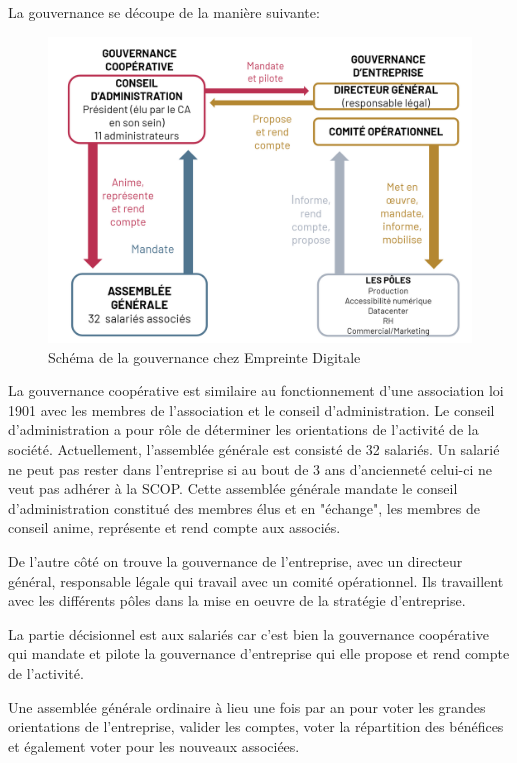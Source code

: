 \documentclass[12pt]{article}
\begin{document}
\newpage
La gouvernance se découpe de la manière suivante:
\begin{figure}[!ht]
    \centering
    \includegraphics[width=\textwidth]{src/scheme_scop_ed.png}
    \caption{Schéma de la gouvernance chez Empreinte Digitale}
    \label{fig:gouvernance_ed}
\end{figure}

La gouvernance coopérative est similaire au fonctionnement d'une association loi 1901 avec les membres de l'association et le conseil d'administration. 
Le conseil d'administration a pour rôle de déterminer les orientations de l'activité de la société. 
Actuellement, l'assemblée générale est consisté de 32 salariés. 
Un salarié ne peut pas rester dans l'entreprise si au bout de 3 ans d'ancienneté celui-ci ne veut pas adhérer à la \gls{SCOP}. 
Cette assemblée générale mandate le conseil d'administration constitué des membres élus et en "échange", les membres de conseil anime, représente et rend compte aux associés.

De l'autre côté on trouve la gouvernance de l'entreprise, avec un directeur général, responsable légale qui travail avec un comité opérationnel. 
Ils travaillent avec les différents pôles dans la mise en oeuvre de la stratégie d'entreprise.

La partie décisionnel est aux salariés car c'est bien la gouvernance coopérative qui mandate et pilote la gouvernance d'entreprise qui elle propose et rend compte de l'activité.

Une assemblée générale ordinaire à lieu une fois par an pour voter les grandes orientations de l'entreprise, valider les comptes, voter la répartition des bénéfices et également voter pour les nouveaux associées.
\end{document}
